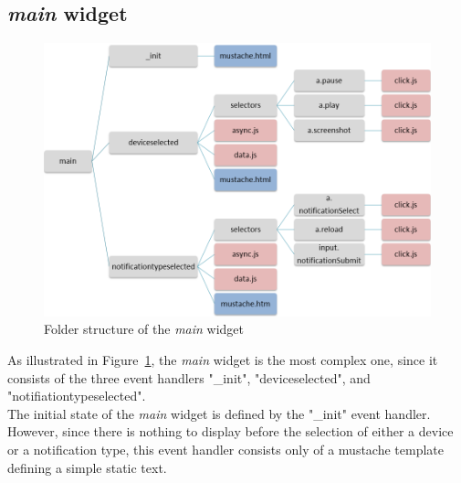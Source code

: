 \subsection{\emph{main} widget}
\label{couchapp:labloungedeveloper:main}
\begin{figure}[h!]
\centering
\includegraphics[width=1.0\columnwidth]{images/labloungestructuremain.png}
\caption{Folder structure of the \emph{main} widget}
\label{img:structuremain}
\end{figure}
As illustrated in Figure~\ref{img:structuremain}, the \emph{main} widget is the most complex one, since it consists of the three event handlers "\_init", "deviceselected", and "notifiationtypeselected".\\
The initial state of the \emph{main} widget is defined by the "\_init" event handler. However, since there is nothing to display before the selection of either a device or a notification type, this event handler consists only of a mustache template defining a simple static text.

